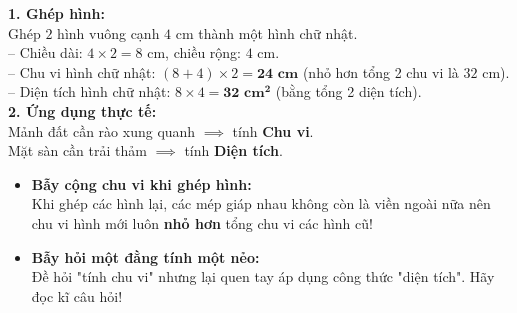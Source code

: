 \documentclass[11pt,a4paper]{article}
\begin{document}
\vspace{-2.5mm}
\noindent
\begin{minipage}[t]{0.49\textwidth}\vspace{0pt}
\begin{tcolorbox}[
  enhanced,
  colback=green!4!white,
  colframe=green!60!black,
  arc=2mm, boxrule=0.8pt,
  left=2mm, right=2mm, top=1.8mm, bottom=1.8mm,
  title={\footnotesize\bfseries\color{white}\faCheckCircle\ Ví dụ thực hành chuẩn mực}
]
{\footnotesize
\textbf{1. Ghép hình:}\\
Ghép $2$ hình vuông cạnh $4\text{ cm}$ thành một hình chữ nhật.\\
-- Chiều dài: $4 \times 2 = 8\text{ cm}$, chiều rộng: $4\text{ cm}$.\\
-- Chu vi hình chữ nhật: $(8 + 4) \times 2 = \mathbf{24\text{ cm}}$ (nhỏ hơn tổng 2 chu vi là $32\text{ cm}$).\\
-- Diện tích hình chữ nhật: $8 \times 4 = \mathbf{32\text{ cm}^2}$ (bằng tổng 2 diện tích).\\
\textbf{2. Ứng dụng thực tế:}\\
Mảnh đất cần rào xung quanh $\implies$ tính \textbf{Chu vi}.\\
Mặt sàn cần trải thảm $\implies$ tính \textbf{Diện tích}.
}
\end{tcolorbox}
\end{minipage}
\hfill
\begin{minipage}[t]{0.49\textwidth}\vspace{0pt}
\begin{tcolorbox}[
  enhanced,
  colback=red!4!white,
  colframe=red!70!black,
  arc=2mm, boxrule=0.8pt,
  left=2mm, right=2mm, top=1.8mm, bottom=1.8mm,
  title={\footnotesize\bfseries\color{white}\faExclamationTriangle\ Mẹo tránh bẫy trắc nghiệm}
]
{\footnotesize
\begin{itemize}\setlength{\itemsep}{1.5pt}\setlength{\leftskip}{-2.5mm}
  \item \textbf{Bẫy cộng chu vi khi ghép hình:}\\
  Khi ghép các hình lại, các mép giáp nhau không còn là viền ngoài nữa nên chu vi hình mới luôn \textbf{nhỏ hơn} tổng chu vi các hình cũ!
  \item \textbf{Bẫy hỏi một đằng tính một nẻo:}\\
  Đề hỏi "tính chu vi" nhưng lại quen tay áp dụng công thức "diện tích". Hãy đọc kĩ câu hỏi!
\end{itemize}
}
\end{tcolorbox}
\end{minipage}
\end{document}
